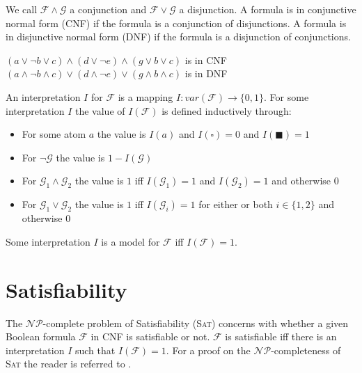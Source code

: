 \begin{definition}
We call $\mathcal{F}\land\mathcal{G}$  a conjunction and $\mathcal{F}\lor\mathcal{G}$ a disjunction.
A formula is in conjunctive normal form (CNF) if the formula is a conjunction of disjunctions.
A formula is in disjunctive normal form (DNF) if the formula is a disjunction of conjunctions.
\end{definition}
\begin{example}
$\left(a \lor \neg b \lor c\right)\land\left(d \lor \neg e\right)\land\left(g \lor b \lor c\right)$ is in CNF\\
$\left(a \land \neg b \land c\right)\lor\left(d \land \neg e\right)\lor\left(g \land b \land c\right)$ is in DNF\\
\end{example}
\begin{definition}
An interpretation $I$ for $\mathcal{F}$ is a mapping $I\colon var(\mathcal{F}) \to \{0,1\}$.
For some interpretation $I$ the value of $I(\mathcal{F})$ is defined inductively through:
\begin{itemize}
    \item For some atom $a$ the value is $I(a)$ and $I\left(\square\right)=0$ and $I\left(\blacksquare\right)=1$
    \item For $\neg\mathcal{G}$ the value is $1-I(\mathcal{G})$
    \item For $\mathcal{G}_1 \land \mathcal{G}_2$ the value is $1$ iff $I(\mathcal{G}_1)=1$ and $I(\mathcal{G}_2)=1$  and otherwise $0$
    \item For $\mathcal{G}_1 \lor \mathcal{G}_2$ the value is $1$ iff $I(\mathcal{G}_i)=1$ for either or both $i\in\{1,2\}$ and otherwise $0$
\end{itemize}

Some interpretation $I$ is a model for $\mathcal{F}$ iff $I(\mathcal{F})=1$.
\end{definition}
\section{Satisfiability}
The $\mathcal{NP}$-complete problem of Satisfiability (\textsc{Sat}) concerns with whether a given Boolean formula $\mathcal{F}$ in CNF is satisfiable or not. $\mathcal{F}$ is satisfiable iff there is an interpretation $I$ such that $I(\mathcal{F})=1$. For a proof on the $\mathcal{NP}$-completeness of \textsc{Sat} the reader is referred to \cite{Garey-Intractability}.

